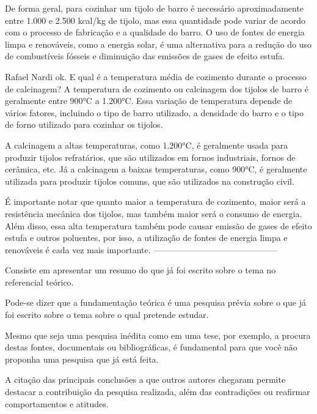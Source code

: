 De forma geral, para cozinhar um tijolo de barro é necessário aproximadamente entre 1.000 e 2.500 kcal/kg de tijolo, mas essa quantidade pode variar de acordo com o processo de fabricação e a qualidade do barro. O uso de fontes de energia limpa e renováveis, como a energia solar, é uma alternativa para a redução do uso de combustíveis fósseis e diminuição das emissões de gases de efeito estufa.




Rafael Nardi
ok. E qual é a temperatura média de cozimento durante o processo de calcinagem?
A temperatura de cozimento ou calcinagem dos tijolos de barro é geralmente entre 900°C a 1.200°C. Essa variação de temperatura depende de vários fatores, incluindo o tipo de barro utilizado, a densidade do barro e o tipo de forno utilizado para cozinhar os tijolos.

A calcinagem a altas temperaturas, como 1.200°C, é geralmente usada para produzir tijolos refratários, que são utilizados em fornos industriais, fornos de cerâmica, etc. Já a calcinagem a baixas temperaturas, como 900°C, é geralmente utilizada para produzir tijolos comuns, que são utilizados na construção civil.

É importante notar que quanto maior a temperatura de cozimento, maior será a resistência mecânica dos tijolos, mas também maior será o consumo de energia. Além disso, essa alta temperatura também pode causar emissão de gases de efeito estufa e outros poluentes, por isso, a utilização de fontes de energia limpa e renováveis é cada vez mais importante.
--------------------------------------------


Consiste em apresentar um resumo do que já foi escrito sobre o tema no referencial teórico.

Pode-se dizer que a fundamentação teórica é uma pesquisa prévia sobre o que já foi escrito sobre o tema sobre o qual pretende estudar.

Mesmo que seja uma pesquisa inédita como em uma tese, por exemplo, a procura destas fontes, documentais ou bibliográficas, é fundamental para que você não proponha uma pesquisa que já está feita.

A citação das principais conclusões a que outros autores chegaram permite destacar a contribuição da pesquisa realizada, além das contradições ou reafirmar comportamentos e atitudes.
